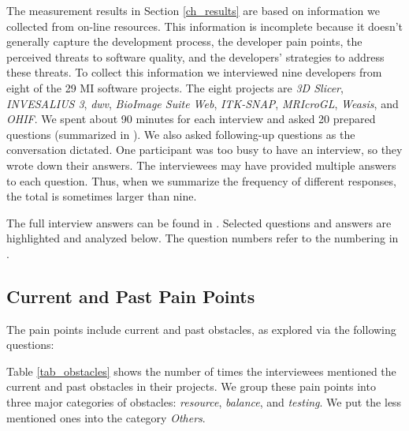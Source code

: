 \documentclass[final, 3p, times, authoryear]{elsarticle}
\begin{document}
The measurement results in Section \ref{ch_results} are based on information we
collected from on-line resources. This information is incomplete because it
doesn't generally capture the development process, the developer pain points,
the perceived threats to software quality, and the developers' strategies to
address these threats. To collect this information we interviewed nine
developers from eight of the 29 MI software projects. The eight projects are
\textit{3D Slicer}, \textit{INVESALIUS 3}, \textit{dwv}, \textit{BioImage Suite
Web}, \textit{ITK-SNAP}, \textit{MRIcroGL}, \textit{Weasis}, and \textit{OHIF}.
We spent about 90 minutes for each interview and asked 20 prepared questions
(summarized in \citet{SmithEtAl2021}). We also asked following-up questions as
the conversation dictated. One participant was too busy to have an interview, so
they wrote down their answers. The interviewees may have provided multiple
answers to each question. Thus, when we summarize the frequency of different
responses, the total is sometimes larger than nine.

The full interview answers can be found in \citet{Dong2021}.  Selected questions
and answers are highlighted and analyzed below.  The question numbers refer to
the numbering in \citet{SmithEtAl2021}.

\subsection{Current and Past Pain Points} \label{sec_interview_pain_points}

The pain points include current and past obstacles, as explored via the
following questions:


Table \ref{tab_obstacles} shows the number of times the interviewees mentioned
the current and past obstacles in their projects.   We group these pain points
into three major categories of obstacles: \textit{resource}, \textit{balance},
and \textit{testing}. We put the less mentioned ones into the category
\textit{Others}. 
\end{document}
